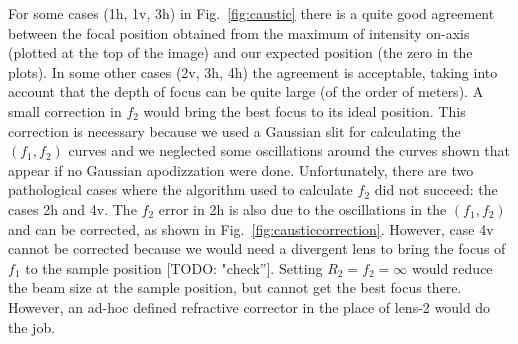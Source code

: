 \documentclass{iucr}              %
\newcommand{\todo}[1]{{\color{red}[TODO: "#1'']}}
\begin{document}
For some cases (1h, 1v, 3h) in Fig.~\ref{fig:caustic} there is a quite good agreement between the focal position obtained from the maximum of intensity on-axis (plotted at the top of the image) and our expected position (the zero in the plots). In some other cases (2v, 3h, 4h) the agreement is acceptable, taking into account that the depth of focus can be quite large (of the order of meters). A small correction in $f_2$ would bring the best focus to its ideal position. This correction is necessary because we used a Gaussian slit for calculating the $(f_1,f_2)$ curves and we neglected some oscillations around the curves shown that appear if no Gaussian apodizzation were done. Unfortunately, there are two pathological cases where the algorithm used to calculate $f_2$ did not succeed: the cases 2h and 4v.
The $f_2$ error in 2h is also due to the oscillations in the $(f_1,f_2)$ and can be corrected, as shown in Fig.~\ref{fig:causticcorrection}. However, case 4v cannot be corrected because we would need a divergent lens to bring the focus of $f_1$ to the sample position \todo{check}. Setting $R_2=f_2=\infty$ would reduce the beam size at the sample position, but cannot get the best focus there. However, an ad-hoc defined refractive corrector in the place of lens-2 would do the job.  
\end{document}
